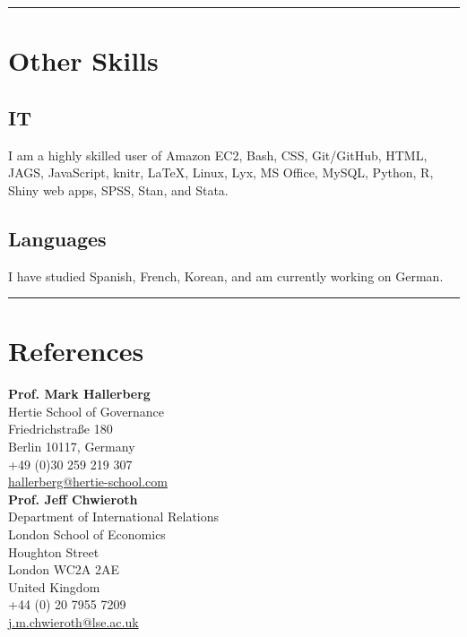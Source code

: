 \documentclass[a4paper]{article}
\begin{document}
{\begin{itemize}
\end{itemize}

\vspace{0.5cm}
\medskip\hrule height 1pt
\vspace{0.5cm}

\section*{Other Skills}

\subsection*{IT}

I am a highly skilled user of Amazon EC2, Bash, CSS, Git/GitHub, HTML, JAGS, JavaScript, knitr, LaTeX, Linux, Lyx, MS Office, MySQL, Python, R, Shiny web apps, SPSS, Stan, and Stata.

\subsection*{Languages}

I have studied Spanish, French, Korean, and am currently working on German.


\vspace{0.5cm}
\medskip\hrule height 1pt
\vspace{0.5cm}

\section*{References}

\noindent \textbf{Prof. Mark Hallerberg} \\
Hertie School of Governance\\
Friedrichstra{\ss}e 180\\
Berlin 10117, Germany \\
+49 (0)30 259 219 307 \\
\href{mailto:hallerberg@hertie-school.com}{hallerberg@hertie-school.com}\\

\noindent \textbf{Prof. Jeff Chwieroth}\\
Department of International Relations \\
London School of Economics \\
Houghton Street \\
London WC2A 2AE \\
United Kingdom\\
+44 (0) 20 7955 7209\\
\href{mailto:j.m.chwieroth@lse.ac.uk}{j.m.chwieroth@lse.ac.uk}\\

}
\end{document}
